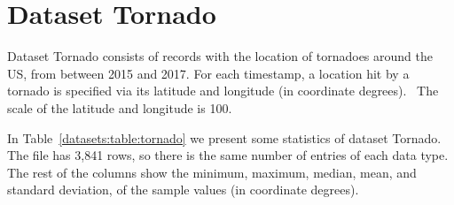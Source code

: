 
\vspace{-20pt}
\section{Dataset Tornado}
\label{datasets:tornado}


\vspace{-5pt}
Dataset Tornado \cite{dataset:spc} consists of records with the location of tornadoes around the US, from between 2015 and 2017. For each timestamp, a location hit by a tornado is specified via its latitude and longitude (in coordinate degrees). \SPCDef \ The scale of the latitude and longitude is 100.


In Table~\ref{datasets:table:tornado} we present some statistics of dataset Tornado. \SPCTable The file has 3,841 rows, so there is the same number of entries of each data type. The rest of the columns show the minimum, maximum, median, mean, and standard deviation, of the sample values (in coordinate degrees).





\clearpage

